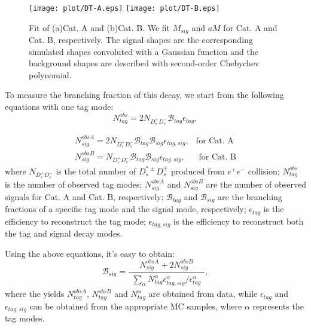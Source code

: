 {    \begin{figure*}[!htbp]
        \centering
        \texttt{[image: plot/DT-A.eps]}
        \texttt{[image: plot/DT-B.eps]}
        \caption{Fit of (a)Cat. A and (b)Cat. B.
            We fit $M_{sig}$ and $aM$ for Cat. A and Cat. B, respectively. The signal shapes are the corresponding simulated shapes convoluted with a Gaussian function and 
        the background shapes are described with second-order Chebychev polynomial.}
        \label{DT-fit}
    \end{figure*}

    To measure the branching fraction of this decay, we start from the following equations with one tag mode:
    \begin{equation}
        N_{tag}^{obs} = 2N_{D_{s}^{+}D_{s}^{-}}\mathcal{B}_{tag}\epsilon_{tag}, \label{eq-ST}
    \end{equation}

    \begin{equation}
        \begin{array}{lr}
            N_{sig}^{obsA}=2N_{D_{s}^{+}D_{s}^{-}}\mathcal{B}_{tag}\mathcal{B}_{sig}\epsilon_{tag,sig}  , &\text{for Cat. A} \\
            N_{sig}^{obsB}=N_{D_{s}^{+}D_{s}^{-}}\mathcal{B}_{tag}\mathcal{B}_{sig}\epsilon_{tag,sig}  ,  &\text{  for Cat. B}  
        \end{array}
        \label{eq-DT}
    \end{equation}
    where $N_{D_{s}^{+}D_{s}^{-}}$ is the total number of $D_{s}^{*\pm}D_{s}^{\mp}$ produced from $e^{+}e^{-}$ collision; $N_{tag}^{obs}$ is the number of observed tag modes; $N_{sig}^{obsA}$ and $N_{sig}^{obsB}$ are the number of observed signals for Cat. A and Cat. B, respectively; $\mathcal{B}_{tag}$ and $\mathcal{B}_{sig}$ are the branching fractions of a specific tag mode and the signal mode, respectively; $\epsilon_{tag}$ is the efficiency to reconstruct the tag mode; $\epsilon_{tag,sig}$ is the efficiency to reconstruct both the tag and signal decay modes.

    Using the above equations, it's easy to obtain:
    \begin{equation}
    \mathcal{B}_{sig} = \frac{N_{sig}^{obsA}+2N_{sig}^{obsB}}{\begin{matrix}\sum_{\alpha} N_{tag}^{\alpha}\epsilon_{tag,sig}^{\alpha}/\epsilon_{tag}^{\alpha}\end{matrix}}, \label{BR-formula}
    \end{equation}
    where the yields $N_{tag}^{obsA}$, $N_{tag}^{obsB}$ and $N_{tag}^{\alpha}$ are obtained from data, while $\epsilon_{tag}$ and $\epsilon_{tag,sig}$ can be obtained from the appropriate MC samples, where $\alpha$ represents the tag modes.
    

}
